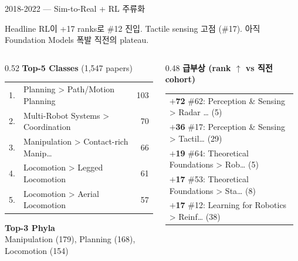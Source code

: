 \documentclass[aspectratio=169,t]{beamer}
\newcommand{\hot}[1]{\textcolor{accentorange}{\textbf{#1}}}
\newcommand{\muted}[1]{\textcolor{mutedgray}{#1}}
\begin{document}
\begin{frame}{2018-2022 \quad — \quad Sim-to-Real + RL 주류화}
\small
\begin{block}{Headline}
RL이 +17 ranks로 \#12 진입. Tactile sensing 고점 (\#17). 아직 Foundation Models 폭발 직전의 plateau.
\end{block}
\vspace{4pt}

\begin{columns}[T,onlytextwidth]
\begin{column}{0.52\textwidth}
\textbf{Top-5 Classes} \muted{\scriptsize (1,547 papers)}\\[2pt]
\scriptsize
\begin{tabular}{@{}rlr@{}}
    1. & Planning > Path/Motion Planning & 103 \\
    2. & Multi-Robot Systems > Coordination & 70 \\
    3. & Manipulation > Contact-rich Manip… & 66 \\
    4. & Locomotion > Legged Locomotion & 61 \\
    5. & Locomotion > Aerial Locomotion & 57 \\
\end{tabular}
\vspace{8pt}

\textbf{\small Top-3 Phyla}\\[2pt]
\scriptsize Manipulation (179), Planning (168), Locomotion (154)
\end{column}

\begin{column}{0.48\textwidth}
\textbf{급부상 (rank $\uparrow$ vs 직전 cohort)}\\[2pt]
\scriptsize
\begin{tabular}{@{}p{0.95\linewidth}@{}}
    \hot{$+$72} \#62: Perception \& Sensing > Radar … (5) \\
    \hot{$+$36} \#17: Perception \& Sensing > Tactil… (29) \\
    \hot{$+$19} \#64: Theoretical Foundations > Rob… (5) \\
    \hot{$+$17} \#53: Theoretical Foundations > Sta… (8) \\
    \hot{$+$17} \#12: Learning for Robotics > Reinf… (38) \\
\end{tabular}
\end{column}
\end{columns}
\end{frame}
\end{document}
